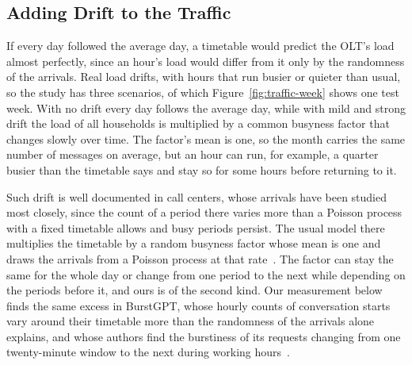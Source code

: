 \documentclass[cic,dipl,english]{infufrgs}
\begin{document}
\subsection{Adding Drift to the Traffic}
\label{sec:drift}

If every day followed the average day, a timetable would predict the OLT's load almost
perfectly, since an hour's load would differ from it only by the randomness of the arrivals.
Real load drifts, with hours that run busier or quieter than usual, so the study has
three scenarios, of which Figure~\ref{fig:traffic-week} shows one test week. With no
drift every day follows the average day, while with mild and strong drift the load of
all households is multiplied by a common busyness factor that changes slowly over time.
The factor's mean is one, so the month carries the same number of messages on average, but an hour
can run, for example, a quarter busier than the timetable says and stay so for some
hours before returning to it.

Such drift is well documented in call centers, whose arrivals have been studied most closely,
since the count of a period there varies more than a Poisson process with a fixed timetable
allows and busy periods persist. The usual model there multiplies the timetable by a random
busyness factor whose mean is one and draws the arrivals from a Poisson process at that
rate~\cite{ibrahim2012modeling}. The factor can stay the same for the whole day or change from
one period to the next while depending on the periods before it, and ours is of the
second kind. Our measurement below finds the same excess in
BurstGPT, whose hourly counts of conversation starts vary around their timetable more than
the randomness of the arrivals alone explains, and whose authors find the burstiness of its requests changing from
one twenty-minute window to the next during working hours~\cite{wang2025burstgpt}.
\end{document}
